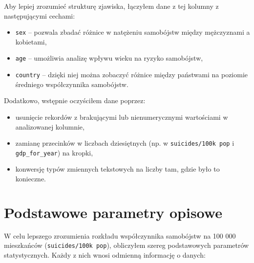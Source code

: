 \documentclass[polish]{article}
\begin{document}
    Aby lepiej zrozumieć strukturę zjawiska, łączyłem dane z tej kolumny z następującymi cechami:

    \begin{itemize}
        \item \texttt{sex} -- pozwala zbadać różnice w natężeniu samobójstw między mężczyznami a kobietami,
        \item \texttt{age} -- umożliwia analizę wpływu wieku na ryzyko samobójstw,
        \item \texttt{country} -- dzięki niej można zobaczyć różnice między państwami na poziomie średniego współczynnika samobójstw.
    \end{itemize}

    Dodatkowo, wstępnie oczyściłem dane poprzez:
    \begin{itemize}
        \item usunięcie rekordów z brakującymi lub nienumerycznymi wartościami w analizowanej kolumnie,
        \item zamianę przecinków w liczbach dziesiętnych (np. w \texttt{suicides/100k pop} i \texttt{gdp\_for\_year}) na kropki,
        \item konwersję typów zmiennych tekstowych na liczby tam, gdzie było to konieczne.
    \end{itemize}



    \newpage

    \section{Podstawowe parametry opisowe}

    W celu lepszego zrozumienia rozkładu współczynnika samobójstw na 100 000 mieszkańców (\texttt{suicides/100k pop}), obliczyłem szereg podstawowych parametrów statystycznych. Każdy z nich wnosi odmienną informację o danych:
\end{document}
